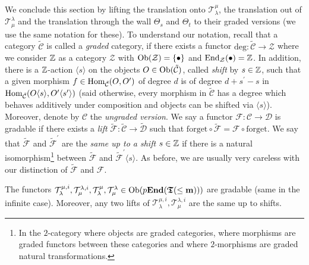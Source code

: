 We conclude this section by lifting the translation 
onto $\mathcal T^{\mu}_{\lambda}$, the translation out 
of $\mathcal T_{\mu}^{\lambda}$ and the 
translation through the wall $\Theta_s$ and $\Theta_t$ 
to their graded versions (we use the same notation for these). 
To understand our notation, recall that a category 
$\tilde{\mathcal C}$ is called a \textit{graded} 
category, if there exists a functor 
$\mathrm{deg}\colon\tilde{\mathcal C}\to\mathcal Z$ 
where we consider $\mathbb{Z}$ as a category $\mathcal Z$ 
with $\mathrm{Ob}(\mathcal Z)=\{\bullet\}$ and 
$\mathrm{End}_{\mathcal Z}(\bullet)=\mathbb{Z}$. In addition, there is a 
$\mathbb{Z}$-action $\langle s\rangle$ on the objects 
$O\in\mathrm{Ob}(\tilde{\mathcal C})$, called \textit{shift} 
by $s\in\mathbb{Z}$, such that a given morphism 
$f\in\mathrm{Hom}_{\tilde{\mathcal C}}(O,O^{\prime})$ of 
degree $d$ is of degree $d+s^{\prime}-s$ in 
$\mathrm{Hom}_{\tilde{\mathcal C}}(O\langle s\rangle,O^{\prime}\langle s^{\prime}\rangle)$ 
(said otherwise, 
every morphism in $\tilde{\mathcal C}$ has a degree which behaves 
additively under composition and objects can be shifted via 
$\langle s\rangle$). Moreover, denote by $\mathcal C$ the 
\textit{ungraded version}. We say a functor 
$\mathcal F\colon\mathcal C\to\mathcal D$ is gradable 
if there exists a \textit{lift} 
$\tilde{\mathcal F}\colon\tilde{\mathcal C}\to\tilde{\mathcal D}$ such that
$\mathrm{forget}\circ\tilde{\mathcal F}=\mathcal F\circ\mathrm{forget}$.
We say that $\tilde{\mathcal F}$ 
and $\tilde{\mathcal F}^{\prime}$ are the 
\textit{same up to a shift $s\in\mathbb{Z}$} if there 
is a natural isomorphism\footnote{In the $2$-category 
where objects are graded categories, where morphisms 
are graded functors between these categories and 
where $2$-morphisms are graded natural transformations.} 
between $\tilde{\mathcal F}$ and $\tilde{\mathcal F}^{\prime}\langle s\rangle$.
As before, we are usually very 
careless with our distinction 
of $\tilde{\mathcal F}$ and $\mathcal F$.


\begin{cor}\label{cor-funcgrad2}
The functors 
$\mathcal T_{\lambda}^{\mu,i},\mathcal T_{\mu}^{\lambda,i},\mathcal T_{\lambda}^{\mu},\mathcal T_{\mu}^{\lambda}\in\mathrm{Ob}(p\boldsymbol{\mathrm{End}}(\boldsymbol{\mathfrak{T}}(\leq\boldsymbol{\mathrm{m}})))$
are gradable (same in the infinite case). 
Moreover, any two lifts of 
$\mathcal T_{\lambda}^{\mu,i},\mathcal T^{\lambda,i}_{\mu}$ are the same up to shifts.\makeqed
\end{cor}



